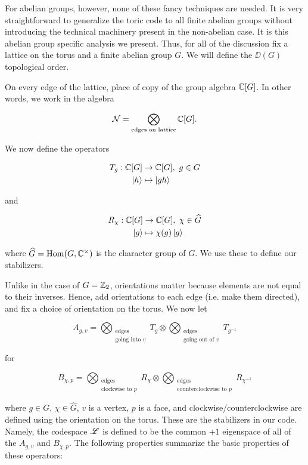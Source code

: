 \documentclass{article}
\theoremstyle{definition}
\numberwithin{figure}{section}
\begin{document}
For abelian groups, however, none of these fancy techniques are needed. It is very straightforward to generalize the toric code to all finite abelian groups without introducing the technical machinery present in the non-abelian case. It is this abelian group specific analysis we present. Thus, for all of the discussion fix a lattice on the torus and a finite abelian group $G$. We will define the $\DD(G)$ topological order.

On every edge of the lattice, place of copy of the group algebra $\mathbb{C}[G]$. In other words, we work in the algebra

$$\mathcal{N}=\bigotimes_{\text{edges on lattice}}\mathbb{C}[G].$$

We now define the operators

\begin{align*}
T_g:\mathbb{C}[G]&\to\mathbb{C}[G],\,\, g\in G\\
\left| h\right>&\mapsto \left| gh\right>
\end{align*}

and

\begin{align*}
R_\chi:\mathbb{C}[G]&\to\mathbb{C}[G],\,\, \chi\in \widehat{G}\\
\left| g\right>&\mapsto \chi(g)\left| g\right>
\end{align*}

where $\widehat{G}=\mathrm{Hom}(G,\mathbb{C}^\times)$ is the character group of $G$. We use these to define our stabilizers.

Unlike in the case of $G=\mathbb{Z}_2$, orientations matter because elements are not equal to their inverses. Hence, add orientations to each edge (i.e. make them directed), and fix a choice of orientation on the torus. We now let

$$A_{g,v}=\bigotimes_{\substack{\text{edges} \\ \text{going into }v}}T_g \otimes \bigotimes_{\substack{\text{edges} \\ \text{going out of }v}} T_{g^{-1}}$$

for

$$B_{\chi,p}=\bigotimes_{\substack{\text{edges}\\ \text{clockwise to }p}}R_\chi \otimes \bigotimes_{\substack{\text{edges}\\ \text{counterclockwise to }p}}R_{\chi^{-1}}$$

where $g\in G$, $\chi\in \widehat{G}$, $v$ is a vertex, $p$ is a face, and clockwise/counterclockwise are defined using the orientation on the torus. These are the stabilizers in our code. Namely, the codespace $\mathscr{L}$ is defined to be the common $+1$ eigenspace of all of the $A_{g,v}$ and $B_{\chi,p}$. The following properties summarize the basic properties of these operators:
\end{document}
